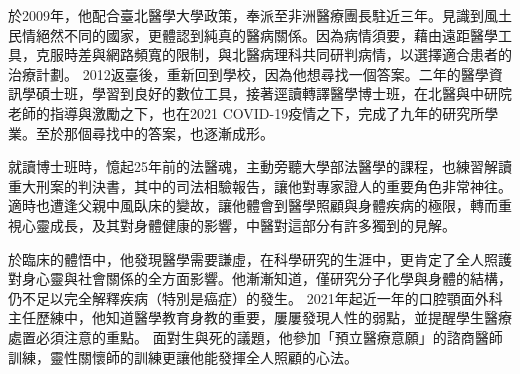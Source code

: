 \documentclass{letter}
\begin{document}
\begin{letter}

於2009年，他配合臺北醫學大學政策，奉派至非洲醫療團長駐近三年。見識到風土民情絕然不同的國家，更體認到純真的醫病關係。因為病情須要，藉由遠距醫學工具，克服時差與網路頻寬的限制，與北醫病理科共同研判病情，以選擇適合患者的治療計劃。
2012返臺後，重新回到學校，因為他想尋找一個答案。二年的醫學資訊學碩士班，學習到良好的數位工具，接著逕讀轉譯醫學博士班，在北醫與中研院老師的指導與激勵之下，也在2021 COVID-19疫情之下，完成了九年的研究所學業。至於那個尋找中的答案，也逐漸成形。


就讀博士班時，憶起25年前的法醫魂，主動旁聽大學部法醫學的課程，也練習解讀重大刑案的判決書，其中的司法相驗報告，讓他對專家證人的重要角色非常神往。
適時也遭逢父親中風臥床的變故，讓他體會到醫學照顧與身體疾病的極限，轉而重視心靈成長，及其對身體健康的影響，中醫對這部分有許多獨到的見解。

於臨床的體悟中，他發現醫學需要謙虛，在科學研究的生涯中，更肯定了全人照護對身心靈與社會關係的全方面影響。他漸漸知道，僅研究分子化學與身體的結構，仍不足以完全解釋疾病（特別是癌症）的發生。
2021年起近一年的口腔顎面外科主任歷練中，他知道醫學教育身教的重要，屢屢發現人性的弱點，並提醒學生醫療處置必須注意的重點。 %
面對生與死的議題，他參加「預立醫療意願」的諮商醫師訓練，靈性關懷師的訓練更讓他能發揮全人照顧的心法。


\end{letter}
\end{document}
